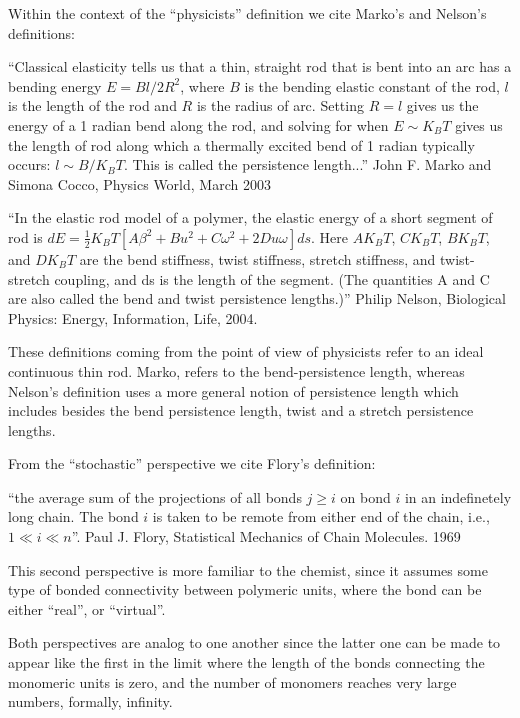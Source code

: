 Within the context of the ``physicists'' definition we cite Marko's
and Nelson's definitions:

``Classical elasticity tells us that a thin, straight rod that is bent
into an arc has a bending energy $E=Bl/2R^2$, where $B$ is the bending
elastic constant of the  rod, $l$ is the length of the  rod and $R$ is
the radius  of arc. Setting  $R=l$ gives us  the energy of a  1 radian
bend along the rod, and solving  for when $E \sim K_{B}T$ gives us the
length  of  rod along  which  a thermally  excited  bend  of 1  radian
typically occurs:  $l \sim B/K_{B}T$.  This is  called the persistence
length...'' John F. Marko and Simona Cocco, Physics World, March 2003

``In the elastic rod model of a polymer, the elastic energy of a short
segment       of       rod       is       $dE=\frac{1}{2}       K_{B}T
[A\beta^2+Bu^2+C\omega^2+2Du\omega]  ds$.  Here  $AK_{B}T$, $CK_{B}T$,
$BK_{B}T$,  and $DK_{B}T$  are  the bend  stiffness, twist  stiffness,
stretch stiffness, and twist-stretch coupling, and ds is the length of
the segment.   (The quantities A  and C are  also called the  bend and
twist  persistence  lengths.)''   Philip Nelson,  Biological  Physics:
Energy, Information, Life, 2004.

These definitions coming from the point of view of physicists refer to
an ideal  continuous thin rod.  Marko, refers  to the bend-persistence
length,  whereas Nelson's  definition uses  a more  general  notion of
persistence length which includes besides the bend persistence length,
twist and a stretch persistence lengths.

From the ``stochastic'' perspective we cite Flory's definition:

``the average sum of  the projections of all bonds $ j  \geq i$ on bond
$i$ in an indefinetely long chain.  The bond $i$ is taken to be remote
from either end of  the chain, i.e., $1 \ll i \ll  n$''. Paul J. Flory,
Statistical Mechanics of Chain Molecules. 1969

This  second perspective  is more  familiar to  the chemist,  since it
assumes  some type  of  bonded connectivity  between polymeric  units,
where the bond can be either ``real'', or ``virtual''.

Both perspectives are  analog to one another since  the latter one can
be made to appear like the first  in the limit where the length of the
bonds  connecting the  monomeric  units  is zero,  and  the number  of
monomers reaches very large numbers, formally, infinity.

